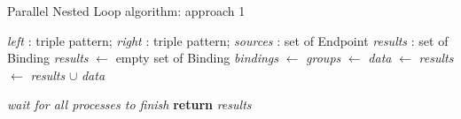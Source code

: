 \begin{algorithm}[ht]
    \caption{Parallel Nested Loop algorithm: approach 1}\label{algo:pbj}
    \begin{algorithmic}[1]
        \Require \textit{left} : triple pattern; \textit{right} : triple pattern; \textit{sources} : set of Endpoint
        \Ensure \textit{results} : set of Binding
            \State \textit{results} $\gets$ empty set of Binding
            \State \textit{bindings} $\gets$ 
            \State \textit{groups} $\gets$ 
                \State \textit{data} $\gets$ 
                \State \textit{results} $\gets$ \textit{results} $\cup$ \textit{data}
            \EndFor
            
            \State \emph{wait for all processes to finish}
            \State \textbf{return} \textit{results}
        \EndFunction
    \end{algorithmic}
\end{algorithm}

